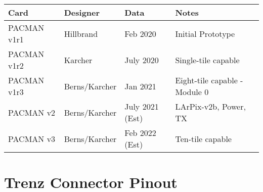 \documentclass[12pt]{article}
\begin{document}
\vskip 0.5cm
\begin{center}
\begin{tabular}{llll}
Card        & Designer      & Data & Notes \\
\hline
PACMAN v1r1 & Hillbrand     & Feb 2020 & Initial Prototype \\
PACMAN v1r2 & Karcher       & July 2020 & Single-tile capable\\
PACMAN v1r3 & Berns/Karcher & Jan 2021 & Eight-tile capable - Module 0\\
PACMAN v2 & Berns/Karcher   & July 2021 (Est) & LArPix-v2b, Power, TX\\
PACMAN v3 & Berns/Karcher   & Feb 2022 (Est) & Ten-tile capable \\
\end{tabular}
\end{center}


\newpage
\section{Trenz Connector Pinout}
\label{app:bigpinout}
\end{document}
